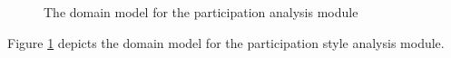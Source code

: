 \begin{figure}[htb]
\begin{center}
\end{center}
\caption{ The domain model for the participation analysis module \label{fig:participation_domainModel}}
\end{figure}

Figure \ref{fig:participation_domainModel} depicts the domain model for the participation style analysis module.


